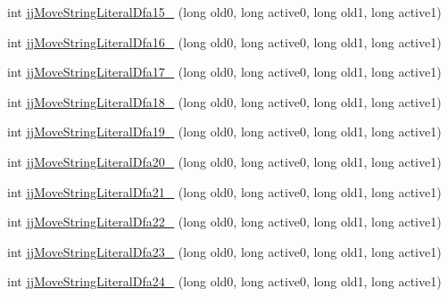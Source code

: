 \begin{DoxyCompactItemize}
int \hyperlink{classorg_1_1coode_1_1owlapi_1_1functionalparser_1_1_o_w_l_functional_syntax_parser_token_manager_a8d9980b3f3d1897e10ace0404eaa19ca}{jj\-Move\-String\-Literal\-Dfa15\-\_} (long old0, long active0, long old1, long active1)
\item 
int \hyperlink{classorg_1_1coode_1_1owlapi_1_1functionalparser_1_1_o_w_l_functional_syntax_parser_token_manager_a0ed5d6db18def688d955bd0216ee936b}{jj\-Move\-String\-Literal\-Dfa16\-\_} (long old0, long active0, long old1, long active1)
\item 
int \hyperlink{classorg_1_1coode_1_1owlapi_1_1functionalparser_1_1_o_w_l_functional_syntax_parser_token_manager_ae75d0806ddf365aa751a2c4af5044e11}{jj\-Move\-String\-Literal\-Dfa17\-\_} (long old0, long active0, long old1, long active1)
\item 
int \hyperlink{classorg_1_1coode_1_1owlapi_1_1functionalparser_1_1_o_w_l_functional_syntax_parser_token_manager_ab3266b54f9f03bf9a55bab694daeb6e3}{jj\-Move\-String\-Literal\-Dfa18\-\_} (long old0, long active0, long old1, long active1)
\item 
int \hyperlink{classorg_1_1coode_1_1owlapi_1_1functionalparser_1_1_o_w_l_functional_syntax_parser_token_manager_a1a9f71a6105ce338a66a66e268ef35ab}{jj\-Move\-String\-Literal\-Dfa19\-\_} (long old0, long active0, long old1, long active1)
\item 
int \hyperlink{classorg_1_1coode_1_1owlapi_1_1functionalparser_1_1_o_w_l_functional_syntax_parser_token_manager_ad295bd3fff5538045e001fd534d7607a}{jj\-Move\-String\-Literal\-Dfa20\-\_} (long old0, long active0, long old1, long active1)
\item 
int \hyperlink{classorg_1_1coode_1_1owlapi_1_1functionalparser_1_1_o_w_l_functional_syntax_parser_token_manager_a88c204fe122b23ab770229140b4d31c8}{jj\-Move\-String\-Literal\-Dfa21\-\_} (long old0, long active0, long old1, long active1)
\item 
int \hyperlink{classorg_1_1coode_1_1owlapi_1_1functionalparser_1_1_o_w_l_functional_syntax_parser_token_manager_a02c0f7659929b40187cdbed15217cd1c}{jj\-Move\-String\-Literal\-Dfa22\-\_} (long old0, long active0, long old1, long active1)
\item 
int \hyperlink{classorg_1_1coode_1_1owlapi_1_1functionalparser_1_1_o_w_l_functional_syntax_parser_token_manager_a30b9ce582592d7c11300ebb7e942e40d}{jj\-Move\-String\-Literal\-Dfa23\-\_} (long old0, long active0, long old1, long active1)
\item 
int \hyperlink{classorg_1_1coode_1_1owlapi_1_1functionalparser_1_1_o_w_l_functional_syntax_parser_token_manager_a29e2015366fbeb7d2f3a8250d4764b47}{jj\-Move\-String\-Literal\-Dfa24\-\_} (long old0, long active0, long old1, long active1)

\end{DoxyCompactItemize}
